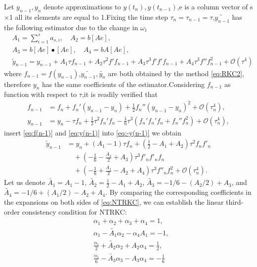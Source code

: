 \documentclass[review,fleqn]{elsarticle}
\begin{document}
 Let $y_{n-1},y_{n}$ denote approximations to $ y(t_n),y(t_{n-1})$,e is a column vector of s$\times$1 all its elements are equal to 1.Fixing the time step $\tau_{n}=\tau_{n-1}=\tau$,$\tilde{y_{n-1}}$ has the following estimator due to the change in $\omega_{1}$
 \begin{align}
     &A_1=\sum_{i=1}^{s}a_{s,i},\quad  A_2=b[Ae],\nonumber \\
     &A_3=b[Ae]\bullet[Ae],\quad A_4=bA[Ae],\nonumber \\
    &\tilde{y}_{n-1} = y_{n-1} + A_1\tau f_{n-1} + A_2\tau^2f'f_{n-1} + A_3\tau^3f'f'f_{n-1} + A_4\tau^3f''f^2_{n-1} + \mathcal{O}(\tau^4) 
     \label{eq:-y(n-1)}
\end{align}
where $f_{n-1}=f(y_{n-1})$,$ \tilde{y_{n-1}},\tilde{y_n}$ are both obtained by the method \eqref{eq:RKC2}, therefore $y_n$ has the same coefficients of the estimator.Considering $f_{n-1}$ as  function with respect to $\tau$,it is readily verified that 
\begin{align}
    f_{n-1} &= f_n + f_n'(y_{n-1} - y_n) + \frac{1}{2}f_n''(y_{n-1} - y_n)^2 + \mathcal{O}(\tau_n^4), \label{eq:f(n-1)} \\
    y_{n-1} &= y_n - \tau f_n + \frac{1}{2}\tau^2f_n'f_n - \frac{1}{6}\tau^3(f_n'f_n'f_n + f_n''f_n^2) + \mathcal{O}(\tau_n^4), \label{eq:y(n-1)}
\end{align}
insert \eqref{eq:f(n-1)} and \eqref{eq:y(n-1)} into \eqref{eq:-y(n-1)} we obtain
\begin{equation}
 \begin{aligned}
    \tilde{y}_{n-1} &= y_n + (A_1-1)\tau f_n + \left(\frac{1}{2}-A_1+A_2\right)\tau^2f_nf'_n  \\
    &\quad + \left(-\frac{1}{6}-\frac{A_2}{2}+A_3\right)\tau^3f'_nf'_nf_n \\
    &\quad + \left(-\frac{1}{6}+\frac{A_1}{2}-A_2+A_4\right)\tau^3f''_nf_n^2 + \mathcal{O}(\tau_n^4).
 \end{aligned}
\end{equation}
Let us denote $\tilde{A_1}=A_1-1$, $\tilde{A_2}=\frac{1}{2}-A_1+A_2$, $\tilde{A_3}=-1/6-(A_2/2)+A_3$, and $\tilde{A_4}=-1/6+(A_1/2)-A_2+A_4$. By comparing the corresponding coefficients in the expansions on both sides of \eqref{eq:NTRKC}, we can establish the linear third-order consistency condition for NTRKC:
\begin{equation}
  \begin{aligned}
    &\alpha _1+\alpha_2+\alpha_3+\alpha _4=1, \\
    &\alpha _1-\tilde{A_1}\alpha _2-\alpha _4A_1=-1, \\
    &\frac{\alpha _1}{2}+\tilde{A_2}\alpha_2+A_2\alpha _4=\frac{1}{2} ,\\
    &\frac{\alpha _1}{6}-\tilde{A_3}\alpha_3-A_3\alpha _4=-\frac{1}{6}   
  \end{aligned}
\end{equation}
\end{document}
